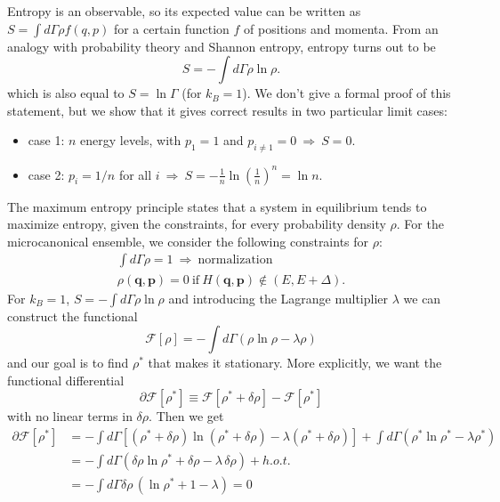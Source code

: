 Entropy is an observable, so its expected value can be written as $S = \int d\Gamma \rho f(q,p)$ for a certain function $f$ of positions and momenta. From an analogy with probability theory and Shannon entropy, entropy turns out to be
\begin{equation}
    S = -\int d\Gamma \rho \ln{\rho}.
\end{equation}
which is also equal to $S=\ln{\Gamma}$ (for $k_B=1$).
We don't give a formal proof of this statement, but we show that it gives correct results in two particular limit cases:
\begin{itemize}
    \item case 1: $n$ energy levels, with $p_1 = 1$ and $p_{i\neq 1} = 0 \: \Rightarrow \: S=0$. \\
    \item case 2: $p_i = 1/n$ for all $i \: \Rightarrow \: S= -\frac{1}{n}\ln(\frac{1}{n})^n = \ln{n}$.
\end{itemize}
The maximum entropy principle states that a system in equilibrium tends to maximize entropy, given the constraints, for every probability density $\rho$. For the microcanonical ensemble, we consider the following constraints for $\rho$:
\begin{gather}
    \int d\Gamma \rho = 1 \: \Rightarrow \: \text{normalization} \\
    \rho(\mathbf{q},\mathbf{p}) = 0 \: \text{if} \: H(\mathbf{q},\mathbf{p}) \not\in (E,E+\Delta).
\end{gather}
For $k_B=1$, $S = -\int d\Gamma \rho \ln{\rho}$ and introducing the Lagrange multiplier $\lambda$ we can construct the functional
\begin{equation}
    \mathcal{F}[\rho] = -\int d\Gamma (\rho \ln{\rho} - \lambda\rho)
\end{equation}
and our goal is to find $\rho^*$ that makes it stationary. More explicitly, we want the functional differential
\begin{equation}
    \partial\mathcal{F}[\rho^*] \equiv \mathcal{F}[\rho^*+\delta\rho] - \mathcal{F}[\rho^*]
\end{equation}
with no linear terms in $\delta\rho$. Then we get
\begin{align}
\label{eq:rho_micro}
    \partial\mathcal{F}[\rho^*] &= -\int d\Gamma [(\rho^*+\delta\rho)\ln(\rho^*+\delta\rho) - \lambda(\rho^*+\delta\rho)] + \int d\Gamma (\rho^*\ln\rho^* - \lambda\rho^*) \nonumber \\
    &= -\int d\Gamma (\delta\rho\ln{\rho^*}+\delta\rho-\lambda\,\delta\rho) + h.o.t. \nonumber \\
    &= -\int d\Gamma \delta\rho \,(\ln{\rho^*}+1-\lambda) = 0
\end{align}
